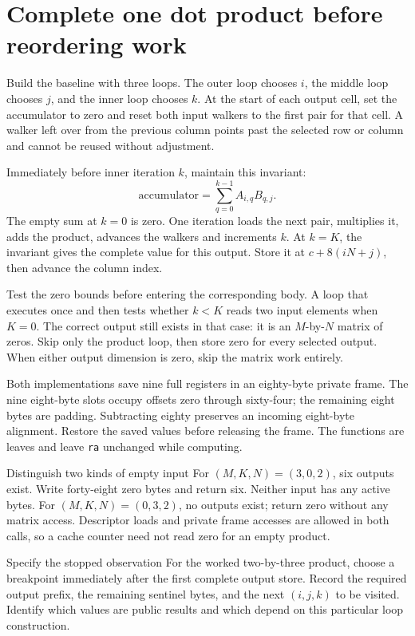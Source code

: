 \section{Complete one dot product before reordering work}
Build the baseline with three loops. The outer loop chooses \(i\), the middle
loop chooses \(j\), and the inner loop chooses \(k\). At the start of each
output cell, set the accumulator to zero and reset both input walkers to the first
pair for that cell. A walker left over from the previous column points past the
selected row or column and cannot be reused without adjustment.

Immediately before inner iteration \(k\), maintain this invariant:
\[
  \text{accumulator}=\sum_{q=0}^{k-1}A_{i,q}B_{q,j}.
\]
The empty sum at \(k=0\) is zero. One iteration loads the next pair, multiplies
it, adds the product, advances the walkers and increments \(k\). At \(k=K\),
the invariant gives the complete value for this output. Store it at
\(c+8(iN+j)\), then advance the column index.

Test the zero bounds before entering the corresponding body. A loop that executes
once and then tests whether \(k<K\) reads two input elements when \(K=0\).
The correct output still exists in that case: it is an \(M\)-by-\(N\) matrix
of zeros. Skip only the product loop, then store zero for every selected output.
When either output dimension is zero, skip the matrix work entirely.

Both implementations save nine full registers in an eighty-byte private frame.
The nine eight-byte slots occupy offsets zero through sixty-four; the remaining
eight bytes are padding. Subtracting eighty preserves an incoming eight-byte
alignment. Restore the saved values before releasing the frame. The functions are
leaves and leave \texttt{ra} unchanged while computing.

\begin{MARSWorkedExample}{Distinguish two kinds of empty input}
  For \((M,K,N)=(3,0,2)\), six outputs exist. Write forty-eight zero bytes and return
  six. Neither input has any active bytes. For \((M,K,N)=(0,3,2)\), no outputs exist;
  return zero without any matrix access. Descriptor loads and private frame accesses
  are allowed in both calls, so a cache counter need not read zero for an empty product.
\end{MARSWorkedExample}

\begin{MARSExercise}{Specify the stopped observation}
  For the worked two-by-three product, choose a breakpoint immediately after the
  first complete output store. Record the required output prefix, the remaining
  sentinel bytes, and the next \((i,j,k)\) to be visited. Identify which values are
  public results and which depend on this particular loop construction.
\end{MARSExercise}
